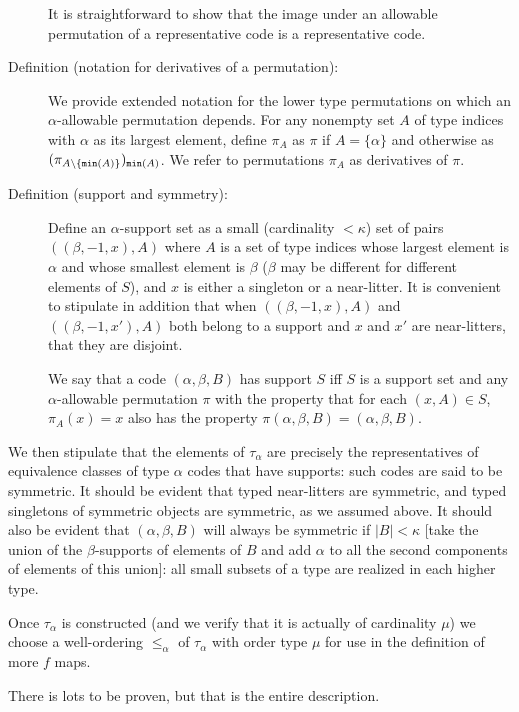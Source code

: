 \documentclass[112pt]{article}
\begin{document}
\begin{description}
It is straightforward to show that the image under an allowable permutation of a representative code is a representative code.

\item[Definition (notation for derivatives of a permutation):] We provide extended notation for the lower type permutations on which an $\alpha$-allowable permutation depends.
For any nonempty set $A$ of type indices with $\alpha$ as its largest element, define $\pi_A$ as $\pi$ if $A = \{\alpha\}$
and otherwise as $(\pi_{A \setminus \{{\tt min}(A)\}})_{{\tt min}(A)}$.  We refer to permutations $\pi_A$ as derivatives of $\pi$.

\item[Definition (support and symmetry):]  Define an $\alpha$-support set as a small (cardinality $<\kappa$) set of pairs $((\beta,-1,x),A)$ where $A$ is a set of type indices whose largest element
is $\alpha$ and whose smallest element is $\beta$ ($\beta$ may be different for different elements of $S$), and $x$ is either a singleton or a near-litter.
It is convenient to stipulate in addition that when $((\beta,-1,x),A)$ and $((\beta,-1,x'),A)$ both belong to a support and $x$ and $x'$ are near-litters, that they are disjoint.

We say that a code $(\alpha,\beta,B)$ has support $S$ iff $S$ is a support set and any $\alpha$-allowable permutation $\pi$ with the property
that for each $(x,A) \in S$, $\pi_A(x)=x$ also has the property $\pi(\alpha,\beta,B)=(\alpha,\beta,B)$.

\end{description}

We then stipulate that the elements of $\tau_\alpha$  are precisely the representatives of equivalence classes of type $\alpha$ codes that have supports:  such codes are said to be symmetric.  It should be evident that typed near-litters are symmetric, and typed singletons of symmetric objects are symmetric, as we assumed above.   It should also be evident that $(\alpha,\beta,B)$ will always be symmetric if $|B|<\kappa$ [take the union of the $\beta$-supports of elements of $B$ and add $\alpha$ to all the second components of elements of this union]:  all small subsets of a type are realized in each higher type.

Once $\tau_\alpha$ is constructed (and we verify that it is actually of cardinality $\mu$) we choose a well-ordering $\leq_\alpha$ of $\tau_\alpha$ with order type $\mu$ for use in the definition of more $f$ maps.

There is lots to be proven, but that is the entire description.
\end{document}
